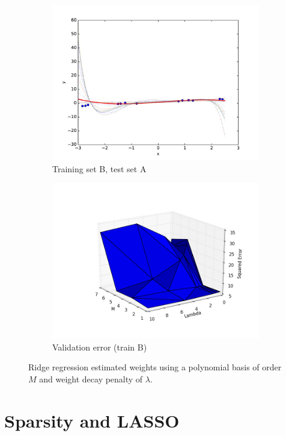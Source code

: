 \documentclass[10pt,psamsfonts]{amsart}
\theoremstyle{definition}
\theoremstyle{remark}
\numberwithin{equation}{section}
\begin{document}
\begin{figure}
\begin{subfigure}[b]{0.24\textwidth}
		\includegraphics[width=\textwidth]{hw1_3-2_B.pdf}
		\caption{Training set B, test set A}
	\end{subfigure}
	\begin{subfigure}[b]{0.24\textwidth}
		\includegraphics[width=\textwidth]{hw1_3-2_B_err.png}
		\caption{Validation error (train B)}
	\end{subfigure}
	\caption{Ridge regression estimated weights using a polynomial basis of order $M$ and weight decay penalty of $\lambda$.}
\end{figure}

\section{Sparsity and LASSO}
\end{document}
